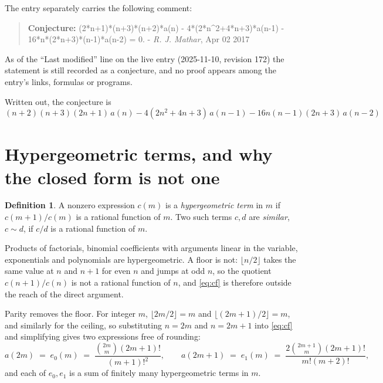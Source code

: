 \documentclass[11pt,a4paper]{article}
\theoremstyle{plain}
\theoremstyle{definition}
\newtheorem{definition}[theorem]{Definition}
\begin{document}
The entry separately carries the following comment:
\begin{quote}\small
\textbf{Conjecture:} (2*n+1)*(n+3)*(n+2)*a(n) - 4*(2*n\^{}2+4*n+3)*a(n-1) - 16*n*(2*n+3)*(n-1)*a(n-2) = 0. - \emph{R. J. Mathar}, Apr 02 2017
\end{quote}
As of the ``Last modified'' line on the live entry (2025-11-10, revision 172) the
statement is still recorded as a conjecture, and no proof appears among the entry's links,
formulas or programs.

Written out, the conjecture is
\begin{equation}\label{eq:conj}
\left(n + 2\right) \left(n + 3\right) \left(2 n + 1\right)\,a(n) -  4 \left(2 n^{2} + 4 n + 3\right)\,a(n-1) -  16 n \left(n - 1\right) \left(2 n + 3\right)\,a(n-2)
\end{equation}

\section{Hypergeometric terms, and why the closed form is not one}

\begin{definition}
A nonzero expression $c(m)$ is a \emph{hypergeometric term} in $m$ if $c(m+1)/c(m)$ is a
rational function of $m$. Two such terms $c,d$ are \emph{similar}, $c\sim d$, if $c/d$ is a
rational function of $m$.
\end{definition}

Products of factorials, binomial coefficients with arguments linear in the variable,
exponentials and polynomials are hypergeometric. A floor is not: $\lfloor n/2\rfloor$ takes
the same value at $n$ and $n+1$ for even $n$ and jumps at odd $n$, so the quotient
$c(n+1)/c(n)$ is not a rational function of $n$, and \eqref{eq:cf} is therefore outside the
reach of the direct argument.

Parity removes the floor. For integer $m$,
$\lfloor 2m/2\rfloor=m$ and $\lfloor (2m+1)/2\rfloor=m$, and similarly for the ceiling, so
substituting $n=2m$ and $n=2m+1$ into \eqref{eq:cf} and simplifying gives two expressions
free of rounding:
\begin{equation}\label{eq:halves}
a(2m)\;=\;e_{0}(m)\;=\;\frac{{\binom{2 m}{m}} \left(2 m + 1\right)!}{\left(m + 1\right)!^{2}},
\qquad
a(2m+1)\;=\;e_{1}(m)\;=\;\frac{2 {\binom{2 m + 1}{m}} \left(2 m + 1\right)!}{m! \left(m + 2\right)!},
\end{equation}
and each of $e_{0},e_{1}$ is a sum of finitely many hypergeometric terms in $m$.
\end{document}

